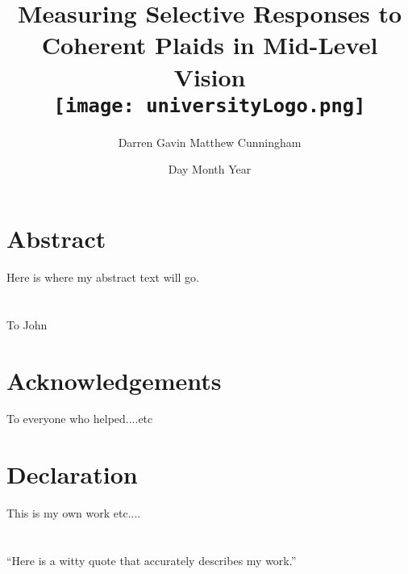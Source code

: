 \documentclass[11pt, a4paper]{report}
\title{
	{Measuring Selective Responses to Coherent Plaids in Mid-Level Vision}\\
	\bigskip
	{\texttt{[image: universityLogo.png]}}
}\par
\author{Darren Gavin Matthew Cunningham}
\date{Day Month Year}
\numberwithin{equation}{section}
\begin{document}
\maketitle


\chapter*{Abstract}

\begin{center}
Here is where my abstract text will go.

\end{center}


\chapter*{}

\vspace{\fill}
\begin{center}
To John
\end{center}
\vspace{\fill}



\chapter*{Acknowledgements}

To everyone who helped....etc



\chapter*{Declaration}

This is my own work etc....



\chapter*{}

\vspace{\fill}
\begin{center}
``Here is a witty quote that accurately describes my work.''
\end{center}
\vspace{\fill}


\tableofcontents

\listoffigures

\listoftables
\end{document}

